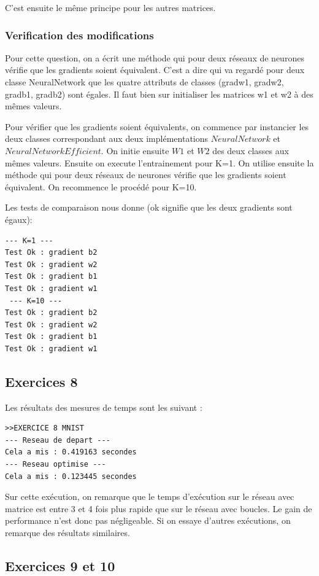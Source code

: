 \documentclass[a4paper,11pt]{article}
\begin{document}
C'est ensuite le même principe pour les autres matrices.

\subsubsection{Verification des modifications}
Pour cette question, on a écrit une méthode qui pour deux réseaux de neurones vérifie que les gradients soient équivalent. C'est a dire qui va regardé pour deux classe NeuralNetwork que les quatre attributs de classes (gradw1, gradw2, gradb1, gradb2) sont égales. Il faut bien sur initialiser les matrices w1 et w2 à des mêmes valeurs.

Pour vérifier que les gradients soient équivalents, on commence par instancier les deux classes correspondant aux deux implémentations $NeuralNetwork$ et $NeuralNetworkEfficient$. On initie ensuite $W1$ et $W2$ des deux classes aux mêmes valeurs. Ensuite on execute l'entrainement pour K=1. On utilise ensuite la méthode qui pour deux réseaux de neurones vérifie que les gradients soient équivalent. On recommence le procédé pour K=10.

Les tests de comparaison nous donne (ok signifie que les deux gradients sont égaux):

\begin{verbatim}
--- K=1 ---
Test Ok : gradient b2
Test Ok : gradient w2
Test Ok : gradient b1
Test Ok : gradient w1
 --- K=10 ---
Test Ok : gradient b2
Test Ok : gradient w2
Test Ok : gradient b1
Test Ok : gradient w1
\end{verbatim}


\subsection{Exercices 8}

Les résultats des mesures de temps sont les suivant : 

\begin{verbatim}
>>EXERCICE 8 MNIST
--- Reseau de depart ---
Cela a mis : 0.419163 secondes
--- Reseau optimise ---
Cela a mis : 0.123445 secondes
\end{verbatim}

Sur cette exécution, on remarque que le temps d'exécution sur le réseau avec matrice est entre 3 et 4 fois plus rapide que sur le réseau avec boucles. Le gain de performance n'est donc pas négligeable.
Si on essaye d'autres exécutions, on remarque des résultats similaires.

\subsection{Exercices 9 et 10}
\end{document}
